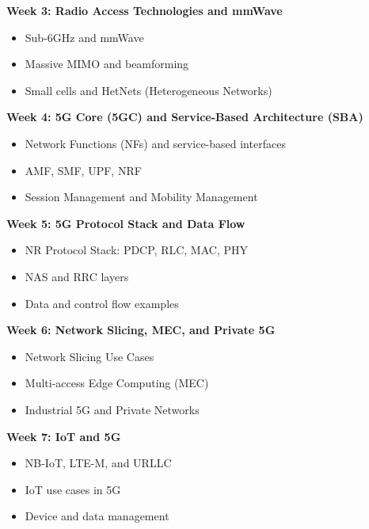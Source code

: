\noindent
\faChevronCircleRight\hspace{0.5em} \textbf{Week 3: Radio Access Technologies and mmWave}
\begin{itemize}
    \item Sub-6GHz and mmWave
    \item Massive MIMO and beamforming
    \item Small cells and HetNets (Heterogeneous Networks)
\end{itemize}

\noindent
\faChevronCircleRight\hspace{0.5em} \textbf{Week 4: 5G Core (5GC) and Service-Based Architecture (SBA)}
\begin{itemize}
    \item Network Functions (NFs) and service-based interfaces
    \item AMF, SMF, UPF, NRF
    \item Session Management and Mobility Management
\end{itemize}

\noindent
\faChevronCircleRight\hspace{0.5em} \textbf{Week 5: 5G Protocol Stack and Data Flow}
\begin{itemize}
    \item NR Protocol Stack: PDCP, RLC, MAC, PHY
    \item NAS and RRC layers
    \item Data and control flow examples
\end{itemize}

\noindent
\faChevronCircleRight\hspace{0.5em} \textbf{Week 6: Network Slicing, MEC, and Private 5G}
\begin{itemize}
    \item Network Slicing Use Cases
    \item Multi-access Edge Computing (MEC)
    \item Industrial 5G and Private Networks
\end{itemize}

\noindent
\faChevronCircleRight\hspace{0.5em} \textbf{Week 7: IoT and 5G}
\begin{itemize}
    \item NB-IoT, LTE-M, and URLLC
    \item IoT use cases in 5G
    \item Device and data management
\end{itemize}

